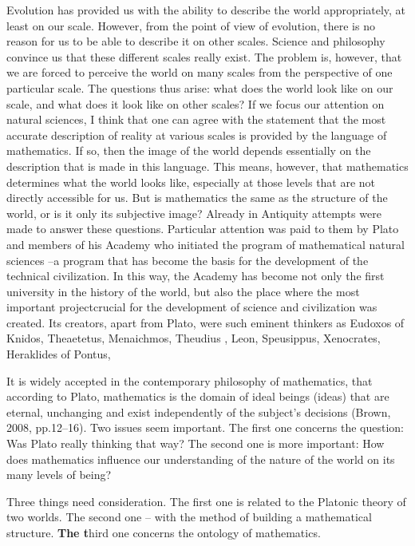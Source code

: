 \documentclass[a4paper]{article}
\newcommand\textstyleFootnoteCharacters[1]{\textsuperscript{#1}}
\begin{document}
Evolution has provided us with the ability to describe the world appropriately, at least on%
 our scale. However, from the point of view of evolution, there is no reason for us to be able to describe it on other
scales. Science and philosophy convince us that these different scales really exist. The problem is, however, that we
are forced to perceive the world on many scales from the perspective of one particular scale. The questions thus arise:
what does the world look like  on our scale, and what does it look like on other scales? If we focus our attention on
natural sciences, I think that one can agree with the statement that the most accurate description of reality at
various scales is provided by the language of mathematics. If so, then the image of the world depends essentially on
the description that is made in this language. This means, however, that mathematics determines what the world looks
like, especially at those levels that are not directly accessible for us. But is mathematics the same as the structure
of the world, or is it only its subjective image? Already in Antiquity\textbf{ }attempts were\textbf{ }made to answer
these questions. Particular attention was paid to them by Plato and members of his Academy who initiated the program of
mathematical natural sciences –a program that has become the basis for the development of the technical civilization.
In this way, the Academy has become not only the first university in the history of the world, but also the place where
the most important projectcrucial for the development of science and civilization was created. Its creators, apart from
Plato, were such eminent thinkers as Eudoxos of Knidos, Theaetetus, Menaichmos, Theudius%
, Leon, Speusippus, Xenocrates, Heraklides of Pontus, 

It is widely accepted in the contemporary philosophy of mathematics, that according to Plato, mathematics is the domain
of ideal beings (ideas) that are eternal, unchanging and exist independently of the subject's decisions
\label{ref:RND4CBsKhvbOj}(Brown, 2008, pp.12–16).\textstyleFootnoteCharacters{ }Two issues seem important. The first
one concerns the question: Was Plato really thinking that way? The second one is more important: How does mathematics
influence our understanding of the nature of the world on its many levels of being?

Three things need consideration. The first one is related to the Platonic theory of {\textquotedbl}two
worlds{\textquotedbl}. The second one – with the method of building a mathematical structure. \textbf{The t}hird one
concerns the ontology of mathematics.
\end{document}
